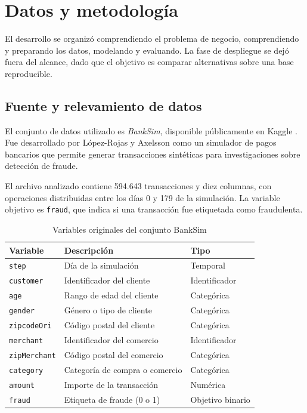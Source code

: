 \section{Datos y metodología}

El desarrollo se organizó comprendiendo el problema de negocio, comprendiendo y preparando los datos, modelando y evaluando. La fase de despliegue se dejó fuera del alcance, dado que el objetivo es comparar alternativas sobre una base reproducible.

\subsection{Fuente y relevamiento de datos}
El conjunto de datos utilizado es \textit{BankSim}, disponible públicamente en Kaggle \cite{dataset}. Fue desarrollado por López-Rojas y Axelsson \cite{inproceedings} como un simulador de pagos bancarios que permite generar transacciones sintéticas para investigaciones sobre detección de fraude.

El archivo analizado contiene 594.643 transacciones y diez columnas, con operaciones distribuidas entre los días 0 y 179 de la simulación. La variable objetivo es \texttt{fraud}, que indica si una transacción fue etiquetada como fraudulenta.

\begin{table}[!htbp]
\centering
\small
\caption{Variables originales del conjunto BankSim}
\label{tab:variables}
\begin{tabular}{@{}p{2.65cm}p{6.0cm}p{3.3cm}@{}}
\toprule
\textbf{Variable} & \textbf{Descripción} & \textbf{Tipo} \\
\midrule
\texttt{step} & Día de la simulación & Temporal \\
\texttt{customer} & Identificador del cliente & Identificador \\
\texttt{age} & Rango de edad del cliente & Categórica \\
\texttt{gender} & Género o tipo de cliente & Categórica \\
\texttt{zipcodeOri} & Código postal del cliente & Categórica \\
\texttt{merchant} & Identificador del comercio & Identificador \\
\texttt{zipMerchant} & Código postal del comercio & Categórica \\
\texttt{category} & Categoría de compra o comercio & Categórica \\
\texttt{amount} & Importe de la transacción & Numérica \\
\texttt{fraud} & Etiqueta de fraude (0 o 1) & Objetivo binario \\
\bottomrule
\end{tabular}
\par\smallskip
\end{table}

